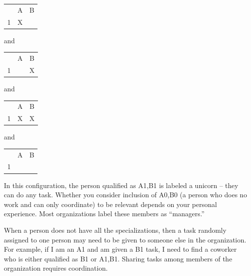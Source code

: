 \begin{center}
\begin{tabular}{c|c|c|}
  & A & B \\
\cline{2-3}
1 & X &   \\
\cline{2-3}
\end{tabular}
\quad and \quad
\begin{tabular}{c|c|c|}
  & A & B \\
\cline{2-3}
1 &   & X \\
\cline{2-3}
\end{tabular}
\quad and \quad
\begin{tabular}{c|c|c|}
  & A & B \\
\cline{2-3}
1 & X & X \\
\cline{2-3}
\end{tabular}
\quad and \quad
\begin{tabular}{c|c|c|}
  & A & B \\
\cline{2-3}
1 &   &   \\
\cline{2-3}
\end{tabular}
\end{center}
In this configuration, the person qualified as A1,B1 is labeled a unicorn -- they can do any task. Whether you consider inclusion of A0,B0 (a person who does no work and can only coordinate) to be relevant depends on your personal experience. Most organizations label these members as ``managers.'' 

When a person does not have all the specializations, then a task randomly assigned to one person may need to be given to someone else in the organization. For example, if I am an A1 and am given a B1 task, I need to find a coworker who is either qualified as B1 or A1,B1. Sharing tasks among members of the organization requires coordination.




